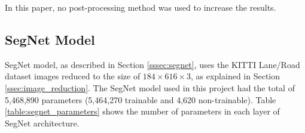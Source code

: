 \documentclass[10pt,twocolumn,letterpaper]{article}
\begin{document}
In this paper, no post-processing method was used to increase the results.

\subsection{SegNet Model} \label{ssec:segnet_model}

SegNet model, as described in Section \ref{sssec:segnet}, uses the KITTI Lane/Road dataset images reduced to the size of $ 184 \times 616 \times 3$, as explained in Section \ref{ssec:image_reduction}. The SegNet model used in this project had the total of 5,468,890 parameters (5,464,270 trainable and 4,620 non-trainable). Table \ref{table:segnet_parameters} shows the number of parameters in each layer of SegNet architecture.
\end{document}
